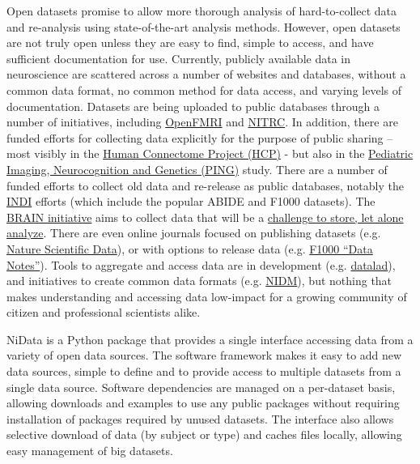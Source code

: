 \documentclass[twocolumn]{bmcart}%
\begin{document}
Open datasets promise to allow more thorough analysis of hard-to-collect
data and re-analysis using state-of-the-art analysis methods. However,
open datasets are not truly open unless they are easy to find, simple to
access, and have sufficient documentation for use. Currently, publicly
available data in neuroscience are scattered across a number of websites
and databases, without a common data format, no common method for data
access, and varying levels of documentation. Datasets are being uploaded
to public databases through a number of initiatives, including
\href{http://www.openfmri.org/}{OpenFMRI} and
\href{http://www.nitrc.org}{NITRC}. In addition, there are funded
efforts for collecting data explicitly for the purpose of public sharing
-- most visibly in the \href{http://www.humanconnectome.org/}{Human
Connectome Project (HCP)} - but also in the
\href{http://pingstudy.ucsd.edu/}{Pediatric Imaging, Neurocognition and
Genetics (PING)} study. There are a number of funded efforts to collect
old data and re-release as public databases, notably the
\href{http://fcon_1000.projects.nitrc.org/indi/IndiRetro.html}{INDI}\cite{Mennes2013}
efforts (which include the popular ABIDE and F1000 datasets). The
\href{http://braininitiative.nih.gov/}{BRAIN initiative} aims to collect
data that will be a
\href{http://www.brainupdate.nih.gov/calling-all-statisticians/}{challenge
to store, let alone analyze}. There are even online journals focused on
publishing datasets (e.g. \href{http://www.nature.com/sdata/}{Nature
Scientific Data}), or with options to release data (e.g.
\href{http://f1000research.com/articles?tab=ALL\&articleTypes=DATA_NOTE\&subjectArea=396}{F1000
``Data Notes''}). Tools to aggregate and access data are in development (e.g. \href{http://www.datalad.org/}{datalad}), 
and initiatives to create common data formats (e.g. \href{http://nidm.nidash.org/}{NIDM}), 
but nothing that makes understanding and accessing data low-impact 
for a growing community of citizen and professional scientists alike.

NiData is a Python package that provides a single interface accessing
data from a variety of open data sources. The software framework makes
it easy to add new data sources, simple to define and to provide access
to multiple datasets from a single data source. Software dependencies
are managed on a per-dataset basis, allowing downloads and examples to
use any public packages without requiring installation of packages
required by unused datasets. The interface also allows selective
download of data (by subject or type) and caches files locally, allowing
easy management of big datasets.
\end{document}
